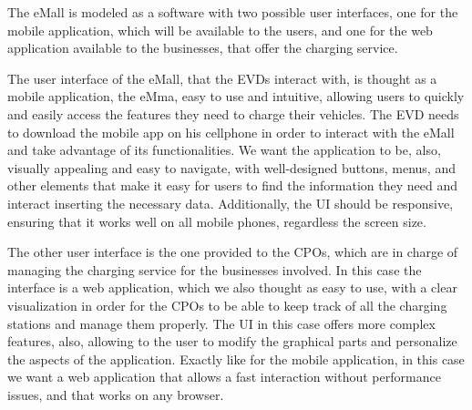 The eMall is modeled as a software with two possible user interfaces, one for the mobile application, which will be available to the users, and one for the web application available to the businesses, that offer the charging service.

The user interface of the eMall, that the EVDs interact with, is thought as a mobile application, the eMma, easy to use and intuitive, allowing users to quickly and easily access the features they need to charge their vehicles. The EVD needs to download the mobile app on his cellphone in order to interact with the eMall and take advantage of its functionalities.
We want the application to be, also, visually appealing and easy to navigate, with well-designed buttons, menus, and other elements that make it easy for users to find the information they need and interact inserting the necessary data. Additionally, the UI should be responsive, ensuring that it works well on all mobile phones, regardless the screen size.

The other user interface is the one provided to the CPOs, which are in charge of managing the charging service for the businesses involved. In this case the interface is a web application, which we also thought as easy to use, with a clear visualization in order for the CPOs to be able to keep track of all the charging stations and manage them properly. The UI in this case offers more complex features, also, allowing to the user to modify the graphical parts and personalize the aspects of the application. Exactly like for the mobile application, in this case we want a web application that allows a fast interaction without performance issues, and that works on any browser. 
